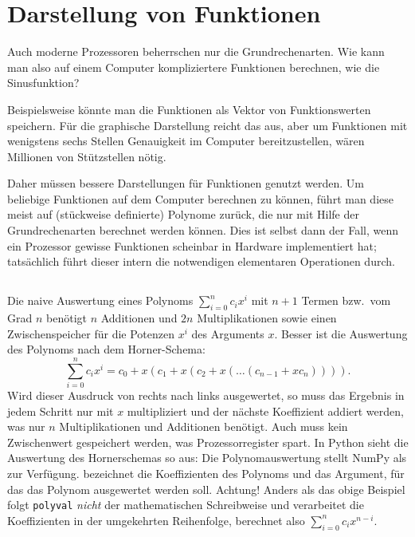 % 

\chapter{Darstellung von Funktionen}

Auch moderne Prozessoren beherrschen nur die Grundrechenarten. Wie
kann man also auf einem Computer kompliziertere Funktionen berechnen,
wie \zb die Sinusfunktion?

Beispielsweise könnte man die Funktionen als Vektor von
Funktionswerten speichern. Für die graphische Darstellung reicht das
aus, aber um Funktionen mit wenigstens sechs Stellen Genauigkeit im
Computer bereitzustellen, wären Millionen von Stützstellen nötig.

Daher müssen bessere Darstellungen für Funktionen genutzt werden.  Um
beliebige Funktionen auf dem Computer berechnen zu können, führt man
diese meist auf (stückweise definierte) Polynome zurück, die nur mit
Hilfe der Grundrechenarten berechnet werden können. Dies ist selbst
dann der Fall, wenn ein Prozessor gewisse Funktionen scheinbar in
Hardware implementiert hat; tatsächlich führt dieser intern die
notwendigen elementaren Operationen durch.

\section{}
\label{sec:horner}

Die naive Auswertung eines Polynoms $\sum_{i=0}^{n} c_ix^{i}$ mit
$n+1$ Termen bzw.\ vom Grad $n$ benötigt $n$ Additionen und $2n$
Multiplikationen sowie einen Zwischenspeicher für die Potenzen $x^i$
des Arguments $x$. Besser ist die Auswertung des Polynoms nach dem
Horner-Schema:
\begin{equation}
  \label{eq:horner}
  \sum_{i=0}^{n} c_ix^{i} = c_0 + x(c_1 + x(c_2 + x(\ldots (c_{n-1} + x c_{n})))).
\end{equation}
Wird dieser Ausdruck von rechts nach links ausgewertet, so muss das
Ergebnis in jedem Schritt nur mit $x$ multipliziert und der nächste
Koeffizient addiert werden, was nur $n$ Multiplikationen und
Additionen benötigt. Auch muss kein Zwischenwert gespeichert werden,
was Prozessorregister spart. In Python sieht die Auswertung des
Hornerschemas so aus:%
%
\sloppypar Die Polynomauswertung stellt NumPy als
 zur Verfügung.  bezeichnet die
Koeffizienten des Polynoms und  das Argument, für das das
Polynom ausgewertet werden soll. Achtung! Anders als das obige
Beispiel folgt \lstinline!polyval! \emph{nicht} der mathematischen
Schreibweise und verarbeitet die Koeffizienten in der umgekehrten
Reihenfolge, berechnet also $\sum_{i=0}^{n} c_ix^{n-i}$.

